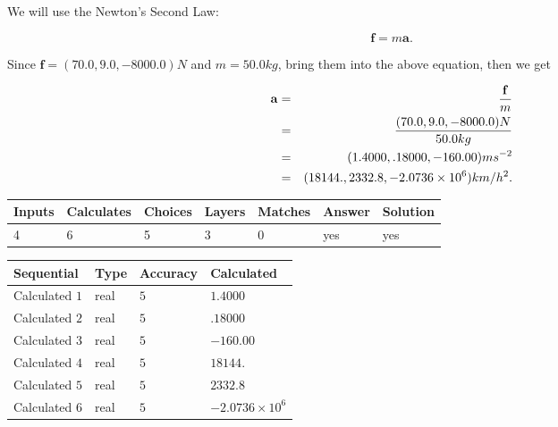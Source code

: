 \documentclass[12pt]{article}
\begin{document}
 

We will use the Newton's Second Law:
 
\[
\mathbf{f}=m\mathbf{a}.
\]
 
Since $\mathbf{f}=( %
70.0,  %
9.0,  %
-8000.0 )N$
and $m= %
50.0kg$, bring them into the above equation, then we get
 
\begin{eqnarray*}
\mathbf{a}&=&\frac{\mathbf{f}}m  \\
&=&\frac{(
70.0 ,
9.0 ,
-8000.0 )N
}{ %
50.0 kg}  \\
&=&(
1.4000 ,
.18000,
-160.00
)ms^{-2} \\
&=&(
18144. ,
2332.8 ,
-2.0736 \times 10^{6}
)km/h^2.
\end{eqnarray*}
 
 
 
\noindent{}
 
 

 
\vspace{0.3in}
   
   
   
   
\noindent\begin{tabular}{|l|l|l|l|l|l|l|}
 \hline
Inputs & Calculates & Choices & Layers & Matches & Answer & Solution \\ \hline
           4 & 
           6 & 
           5
  & 
           3 & 
           0 & 
  yes & 
  yes 
  \\ \hline
 \end{tabular}
   
   
   
   
\noindent{}
   
   
  
  
\noindent\begin{tabular}{|l|l|l|l|}
\hline
 Sequential & Type & Accuracy & Calculated \\ 
\hline
 
 
  Calculated $           1$ & real & $           5 $ & 
 $ 1.4000 $ 
 \\  \hline  
 
 
  Calculated $           2$ & real & $           5 $ & 
 $ .18000 $ 
 \\  \hline  
 
 
  Calculated $           3$ & real & $           5 $ & 
 $ -160.00 $ 
 \\  \hline  
 
 
  Calculated $           4$ & real & $           5 $ & 
 $ 18144. $ 
 \\  \hline  
 
 
  Calculated $           5$ & real & $           5 $ & 
 $ 2332.8 $ 
 \\  \hline  
 
 
  Calculated $           6$ & real & $           5 $ & 
 $ -2.0736 \times 10^{6} $ 
 \\  \hline  
 \end{tabular}
   
\end{document}
